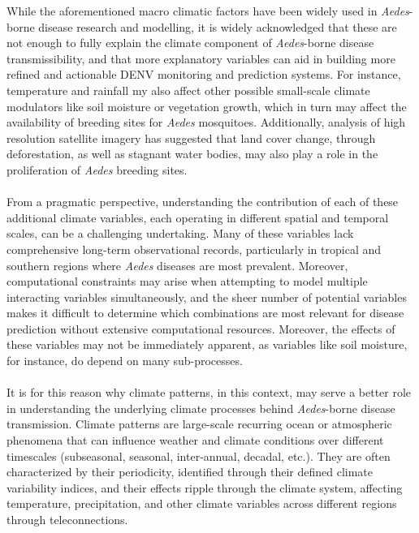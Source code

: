 \documentclass[10pt,twocolumn]{wlscirep}
\begin{document}
While the aforementioned macro climatic factors have been widely used in \textit{Aedes}-borne disease research and modelling\cite{caminade_2017, liu-helmersson_2014, mordecai_2017, wesolowski_2015}, it is widely acknowledged that these are not enough to fully explain the climate component of \textit{Aedes}-borne disease transmissibility, and that more explanatory variables can aid in building more refined and actionable DENV monitoring and prediction systems\cite{erraguntla_2021, lee_2017, yavarinejad_2021, sriklin_2021}. For instance, temperature and rainfall my also affect other possible small-scale climate modulators like soil moisture or vegetation growth, which in turn may affect the availability of breeding sites for \textit{Aedes} mosquitoes. Additionally, analysis of high resolution satellite imagery has suggested that land cover change, through deforestation, as well as stagnant water bodies, may also play a role in the proliferation of \textit{Aedes} breeding sites\cite{ali_2025}.
\\
\\
From a pragmatic perspective, understanding the contribution of each of these additional climate variables, each operating in different spatial and temporal scales, can be a challenging undertaking. Many of these variables lack comprehensive long-term observational records, particularly in tropical and southern regions where \textit{Aedes} diseases are most prevalent\cite{shaw_2024, senroy_2018}. Moreover, computational constraints may arise when attempting to model multiple interacting variables simultaneously, and the sheer number of potential variables makes it difficult to determine which combinations are most relevant for disease prediction without extensive computational resources. Moreover, the effects of these variables may not be immediately apparent, as variables like soil moisture, for instance, do depend on many sub-processes\cite{peng_2023}.
\\
\\
It is for this reason why climate patterns, in this context, may serve a better role in understanding the underlying climate processes behind \textit{Aedes}-borne disease transmission. Climate patterns are large-scale recurring ocean or atmospheric phenomena that can influence weather and climate conditions over different timescales (subseasonal, seasonal, inter-annual, decadal, etc.). They are often characterized by their periodicity, identified through their defined climate variability indices, and their effects ripple through the climate system, affecting temperature, precipitation, and other climate variables across different regions through teleconnections\cite{lubbecke_2018}.
\end{document}
